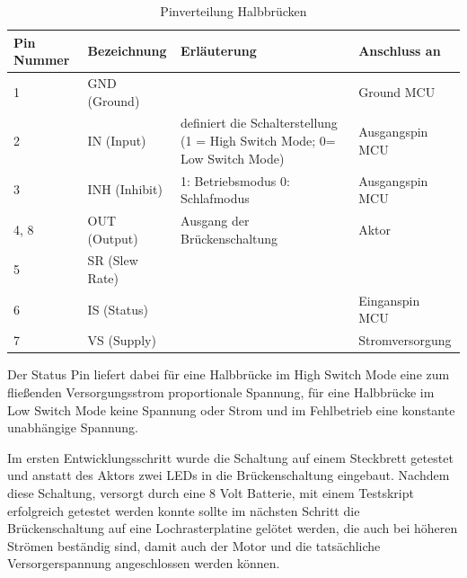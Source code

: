 \begin{table}[h]
	\centering
		\begin{tabular}{l|p{5cm}|p{5cm}|p{5cm}}
			Pin Nummer & Bezeichnung & Erläuterung & Anschluss an \\ \hline
			1 & GND (Ground) & & Ground MCU \\
			2 & IN (Input) & definiert die Schalterstellung (1 = High Switch Mode; 0= Low Switch Mode) & Ausgangspin MCU \\
			3 & INH (Inhibit) & 1: Betriebsmodus
0: Schlafmodus & Ausgangspin MCU \\
			4, 8 & OUT (Output) & Ausgang der Brückenschaltung & Aktor \\
			5 & SR (Slew Rate) & & \\
			6 & IS (Status) & & Einganspin MCU\\
			7 & VS (Supply) & & Stromversorgung\\
		\end{tabular}
	\caption{Pinverteilung Halbbrücken}
	\label{tab:Pinverteilung}
\end{table}
Der Status Pin liefert dabei für eine Halbbrücke im High Switch Mode eine zum fließenden Versorgungsstrom proportionale Spannung, für eine Halbbrücke im Low Switch Mode keine Spannung oder Strom und im Fehlbetrieb eine konstante unabhängige Spannung.

Im ersten Entwicklungsschritt wurde die Schaltung auf einem Steckbrett getestet und anstatt des Aktors zwei LEDs in die Brückenschaltung eingebaut. Nachdem diese Schaltung, versorgt durch eine 8 Volt Batterie, mit einem Testskript erfolgreich getestet werden konnte sollte im nächsten Schritt die Brückenschaltung auf eine Lochrasterplatine gelötet werden, die auch bei höheren Strömen beständig sind, damit auch der Motor und die tatsächliche Versorgerspannung angeschlossen werden können. 